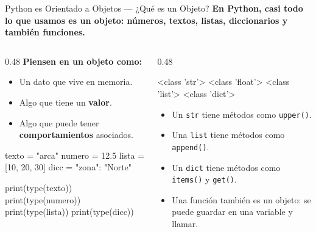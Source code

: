 \documentclass[aspectratio=169, 11pt]{beamer}
\begin{document}
\begin{frame}[fragile,shrink=28]{Python es Orientado a Objetos --- ¿Qué es un Objeto?}
  \vspace{-6pt}
  {\small\color{arcaDark}\bfseries
    En Python, casi todo lo que usamos es un \textbf{objeto}:
    números, textos, listas, diccionarios y también funciones.}

  \vspace{4pt}
  \begin{columns}[T]
    \begin{column}{0.48\textwidth}
      {\footnotesize\color{arcaDark}\bfseries Piensen en un objeto como:}
      \vspace{2pt}
      {\scriptsize\color{textMuted}
      \begin{itemize}\setlength{\itemsep}{4pt}
        \item Un dato que vive en memoria.
        \item Algo que tiene un \textbf{valor}.
        \item Algo que puede tener \textbf{comportamientos}
          asociados.
      \end{itemize}
      }

      \vspace{4pt}
      \begin{pyblock}
texto = "arca"
numero = 12.5
lista = [10, 20, 30]
dicc = {"zona": "Norte"}

print(type(texto))
print(type(numero))
print(type(lista))
print(type(dicc))
      \end{pyblock}
    \end{column}

    \begin{column}{0.48\textwidth}
      \begin{outputblock}
<class 'str'>
<class 'float'>
<class 'list'>
<class 'dict'>
      \end{outputblock}

      \vspace{4pt}
      {\scriptsize\color{textMuted}
      \begin{itemize}\setlength{\itemsep}{4pt}
        \item Un \texttt{str} tiene métodos como
          \texttt{upper()}.
        \item Una \texttt{list} tiene métodos como
          \texttt{append()}.
        \item Un \texttt{dict} tiene métodos como
          \texttt{items()} y \texttt{get()}.
        \item Una función también es un objeto:
          se puede guardar en una variable y llamar.
      \end{itemize}
      }
    \end{column}
  \end{columns}


\end{frame}
\end{document}
